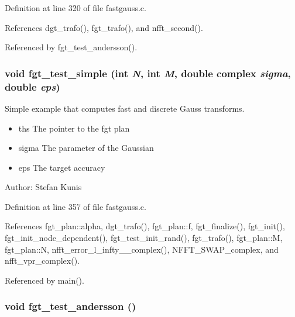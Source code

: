 Definition at line 320 of file fastgauss.c.

References dgt\_\-trafo(), fgt\_\-trafo(), and nfft\_\-second().

Referenced by fgt\_\-test\_\-andersson().\hypertarget{group__applications__fastgauss_ga8}{
\subsubsection[fgt\_\-test\_\-simple]{\setlength{\rightskip}{0pt plus 5cm}void fgt\_\-test\_\-simple (int {\em N}, int {\em M}, double complex {\em sigma}, double {\em eps})}}
\label{group__applications__fastgauss_ga8}


Simple example that computes fast and discrete Gauss transforms. 

\begin{itemize}
\item ths The pointer to the fgt plan \item sigma The parameter of the Gaussian \item eps The target accuracy\end{itemize}
\begin{Desc}
\item[Author:]Stefan Kunis \end{Desc}


Definition at line 357 of file fastgauss.c.

References fgt\_\-plan::alpha, dgt\_\-trafo(), fgt\_\-plan::f, fgt\_\-finalize(), fgt\_\-init(), fgt\_\-init\_\-node\_\-dependent(), fgt\_\-test\_\-init\_\-rand(), fgt\_\-trafo(), fgt\_\-plan::M, fgt\_\-plan::N, nfft\_\-error\_\-l\_\-infty\_\_\-complex(), NFFT\_\-SWAP\_\-complex, and nfft\_\-vpr\_\-complex().

Referenced by main().\hypertarget{group__applications__fastgauss_ga9}{
\subsubsection[fgt\_\-test\_\-andersson]{\setlength{\rightskip}{0pt plus 5cm}void fgt\_\-test\_\-andersson ()}}
\label{group__applications__fastgauss_ga9}


